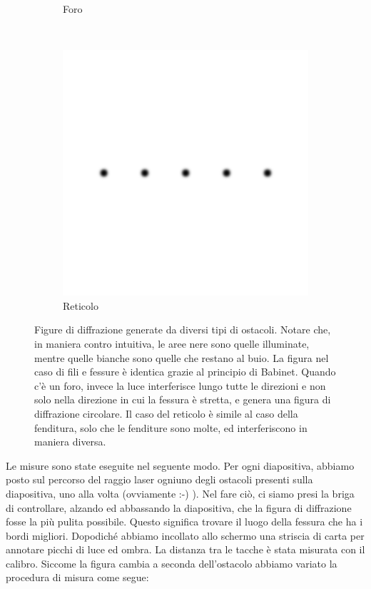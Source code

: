 \begin{figure}[b!]
\begin{subfigure}[b]{0.3\textwidth}
        \caption{Foro}
        \label{fig:foro}
    \end{subfigure}
    ~ %
    \begin{subfigure}[b]{0.3\textwidth}
        \includegraphics[width=\textwidth]{f3.png}
        \caption{Reticolo}
        \label{fig:ret}
    \end{subfigure}
    \caption{Figure di diffrazione generate da diversi tipi di ostacoli. Notare che, in maniera contro intuitiva,
        le aree nere sono quelle illuminate, mentre quelle bianche sono quelle che restano al buio. La figura nel caso di
        fili e fessure è identica grazie al principio di Babinet. Quando c'è un foro, invece la luce interferisce lungo
        tutte le direzioni e non solo nella direzione in cui la fessura è stretta, e genera una figura di diffrazione
        circolare. Il caso del reticolo è simile al caso della fenditura, solo che le fenditure sono molte, ed interferiscono
        in maniera diversa.}
    \label{fig:diff}
\end{figure}

Le misure sono state eseguite nel seguente modo. Per ogni diapositiva, abbiamo posto sul percorso del raggio laser ogniuno degli ostacoli
presenti sulla diapositiva, uno alla volta (ovviamente :-) ). Nel fare ciò, ci siamo presi la briga di controllare, alzando ed abbassando
la diapositiva, che la figura di diffrazione fosse la più pulita possibile. Questo significa trovare il luogo della fessura che ha i bordi
migliori. Dopodiché abbiamo incollato allo schermo una striscia di carta per annotare picchi di luce ed ombra. La distanza tra le tacche
è stata misurata con il calibro. Siccome la figura cambia a seconda dell'ostacolo abbiamo variato la procedura di misura come segue:

